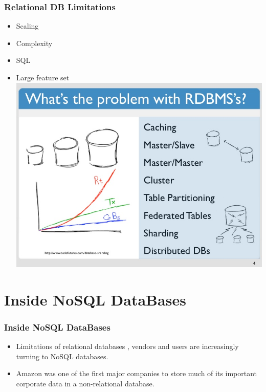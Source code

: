 \documentclass{beamer}
\begin{document}
\begin{frame}\frametitle{Relational DB Limitations}
\begin{itemize}\vspace{.5 cm}
\begin{center}
\textbf{ Limitations}
\end{center}
\item Scaling
\item Complexity
\item SQL
\item Large feature set\newline
\includegraphics[scale=.25]{slide-10-728.jpg}
\end{itemize}
\end{frame}

\section[]{Inside NoSQL DataBases}
\begin{frame}\frametitle{Inside NoSQL DataBases}
\begin{itemize}
\item Limitations of relational databases  , vendors and users are increasingly turning to NoSQL databases.
\newline
\item Amazon was one of the first major companies to store much of its important corporate data in a non-relational database.
\newline
\end{itemize}
\end{frame}
\end{document}
